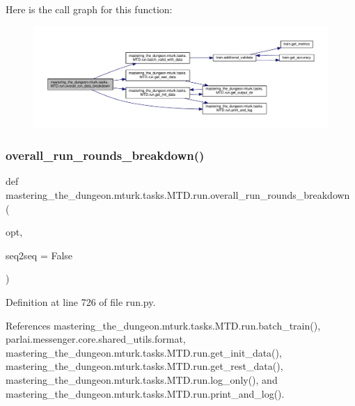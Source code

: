 Here is the call graph for this function\+:
\nopagebreak
\begin{figure}[H]
\begin{center}
\leavevmode
\includegraphics[width=350pt]{namespacemastering__the__dungeon_1_1mturk_1_1tasks_1_1MTD_1_1run_a4f7dcbc08b7657c55f7b5facfdda4488_cgraph}
\end{center}
\end{figure}
\mbox{\label{namespacemastering__the__dungeon_1_1mturk_1_1tasks_1_1MTD_1_1run_a95ef9b461e307b0b7f6bcedec8e24b9f}} 
\subsubsection{\texorpdfstring{overall\+\_\+run\+\_\+rounds\+\_\+breakdown()}{overall\_run\_rounds\_breakdown()}}
{\footnotesize\ttfamily def mastering\+\_\+the\+\_\+dungeon.\+mturk.\+tasks.\+M\+T\+D.\+run.\+overall\+\_\+run\+\_\+rounds\+\_\+breakdown (\begin{DoxyParamCaption}\item[{}]{opt,  }\item[{}]{seq2seq = {\ttfamily False} }\end{DoxyParamCaption})}



Definition at line 726 of file run.\+py.



References mastering\+\_\+the\+\_\+dungeon.\+mturk.\+tasks.\+M\+T\+D.\+run.\+batch\+\_\+train(), parlai.\+messenger.\+core.\+shared\+\_\+utils.\+format, mastering\+\_\+the\+\_\+dungeon.\+mturk.\+tasks.\+M\+T\+D.\+run.\+get\+\_\+init\+\_\+data(), mastering\+\_\+the\+\_\+dungeon.\+mturk.\+tasks.\+M\+T\+D.\+run.\+get\+\_\+rest\+\_\+data(), mastering\+\_\+the\+\_\+dungeon.\+mturk.\+tasks.\+M\+T\+D.\+run.\+log\+\_\+only(), and mastering\+\_\+the\+\_\+dungeon.\+mturk.\+tasks.\+M\+T\+D.\+run.\+print\+\_\+and\+\_\+log().

